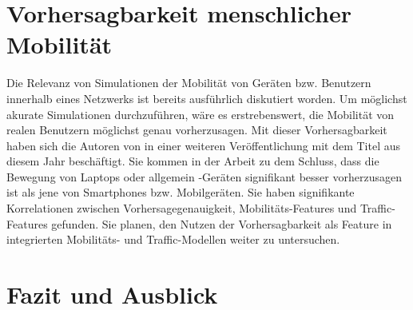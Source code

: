 \documentclass[12pt, a4paper]{article}
\begin{document}
\section{Vorhersagbarkeit menschlicher Mobilität}
\label{sec:mobility_predictability}
Die Relevanz von Simulationen der Mobilität von Geräten bzw. Benutzern innerhalb eines Netzwerks
ist bereits ausführlich diskutiert worden. Um möglichst akurate Simulationen durchzuführen, wäre es erstrebenswert,
die Mobilität von realen Benutzern möglichst genau vorherzusagen. Mit dieser Vorhersagbarkeit haben sich die Autoren
von \cite{Alipour2018} in einer weiteren Veröffentlichung mit dem Titel \cite{Alipour2019} aus diesem Jahr beschäftigt.
Sie kommen in der Arbeit zu dem Schluss, dass die Bewegung von Laptops oder allgemein -Geräten
signifikant besser vorherzusagen ist als jene von Smartphones bzw. Mobilgeräten.\newline
Sie haben signifikante Korrelationen zwischen Vorhersagegenauigkeit, Mobilitäts-Features
und Traffic-Features gefunden. Sie planen, den Nutzen der Vorhersagbarkeit als Feature 
in integrierten Mobilitäts- und Traffic-Modellen weiter zu untersuchen.

\section{Fazit und Ausblick}
\label{sec:conclusion}
\end{document}

